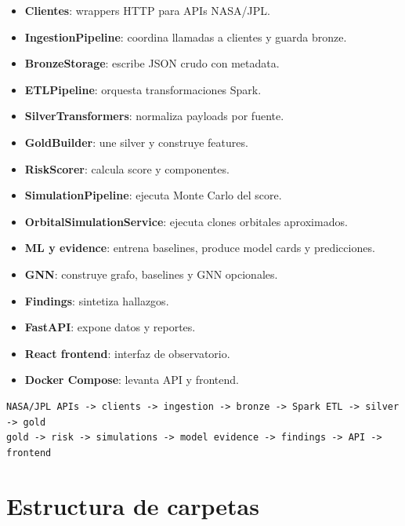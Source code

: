 \documentclass[11pt,letterpaper]{article}
\begin{document}
\begin{itemize}
  \item \textbf{Clientes}: wrappers HTTP para APIs NASA/JPL.
  \item \textbf{IngestionPipeline}: coordina llamadas a clientes y guarda bronze.
  \item \textbf{BronzeStorage}: escribe JSON crudo con metadata.
  \item \textbf{ETLPipeline}: orquesta transformaciones Spark.
  \item \textbf{SilverTransformers}: normaliza payloads por fuente.
  \item \textbf{GoldBuilder}: une silver y construye features.
  \item \textbf{RiskScorer}: calcula score y componentes.
  \item \textbf{SimulationPipeline}: ejecuta Monte Carlo del score.
  \item \textbf{OrbitalSimulationService}: ejecuta clones orbitales aproximados.
  \item \textbf{ML y evidence}: entrena baselines, produce model cards y predicciones.
  \item \textbf{GNN}: construye grafo, baselines y GNN opcionales.
  \item \textbf{Findings}: sintetiza hallazgos.
  \item \textbf{FastAPI}: expone datos y reportes.
  \item \textbf{React frontend}: interfaz de observatorio.
  \item \textbf{Docker Compose}: levanta API y frontend.
\end{itemize}

\begin{lstlisting}
NASA/JPL APIs -> clients -> ingestion -> bronze -> Spark ETL -> silver -> gold
gold -> risk -> simulations -> model evidence -> findings -> API -> frontend
\end{lstlisting}

\section{Estructura de carpetas}
\end{document}
